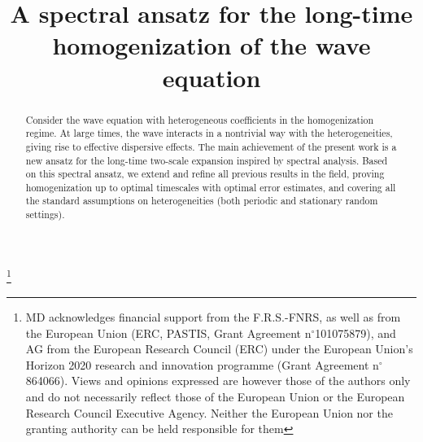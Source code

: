 \documentclass[JEP,XML,SOM,Unicode,published]{cedram}
\theoremstyle{plain}
\theoremstyle{definition}
\numberwithin{equation}{section}
\begin{document}
\frontmatter

\title[Long-time homogenization of the wave equation]{A spectral ansatz for the long-time homogenization of the wave equation}

\author[\initial{M.} \lastname{Duerinckx}]{ }
\address{Université Libre de Bruxelles, Département de Mathématique,\\ 1050 Brussels, Belgium}

\author[\initial{A.} \lastname{Gloria}]{ }
\address{Sorbonne Université, CNRS, Université de Paris, Laboratoire Jacques-Louis Lions,\\ 75005~Paris, France\\
\& Institut Universitaire de France\\
\& Université Libre de Bruxelles, Département de Mathématique,\\
1050~Brussels, Belgium}

\author[\initial{M.} \lastname{Ruf}]{ }
\address{École Polytechnique Fédérale de Lausanne, Section de mathématiques,\\ 1015~Lausanne, Switzerland}

\thanks{MD acknowledges financial support from the F.R.S.-FNRS, as well as from the European Union (ERC, PASTIS, Grant Agreement n$^\circ$101075879), and AG from the European Research Council (ERC) under the European Union's Horizon 2020 research and innovation programme (Grant Agreement n$^\circ$864066). Views and opinions expressed are however those of the authors only and do not necessarily reflect those of the European Union or the European Research Council Executive Agency. Neither the European Union nor the granting authority can be held responsible for them}

\begin{abstract}
Consider the wave equation with heterogeneous coefficients in the homogenization regime. At large times, the wave interacts in a nontrivial way with the heterogeneities, giving rise to effective dispersive effects. The main achievement of the present work is a new ansatz for the long-time two-scale expansion inspired by spectral analysis. Based on this spectral ansatz, we extend and refine all previous results in the field, proving homogenization up to optimal timescales with optimal error estimates, and covering all the standard assumptions on heterogeneities (both periodic and stationary random settings).
\end{abstract}
\end{document}
